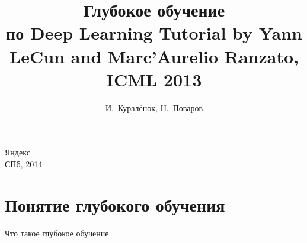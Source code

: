 \documentclass[14pt, fleqn, xcolor={dvipsnames, table}]{beamer}
\title{Глубокое обучение\\\small{по Deep Learning Tutorial by Yann LeCun and Marc'Aurelio Ranzato, ICML 2013}}
\author[]{\small{%
И.~Куралёнок,
Н.~Поваров}}
\date{}
\begin{document}
\begin{frame}
\maketitle
\small
\begin{center}
\vspace{-60pt}
\normalsize {\color{red}Я}ндекс \\
\vspace{80pt}
\footnotesize СПб, 2014
\end{center}
\end{frame}
\section{Понятие глубокого обучения} %

\begin{frame}{Что такое глубокое обучение}
\end{frame}
\end{document}
